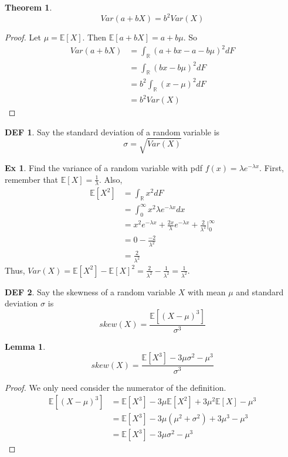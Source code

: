 \documentclass{article}
\newtheorem{theorem}{Theorem}
\theoremstyle{definition}\newtheorem{definition}{DEF}
\theoremstyle{definition}\newtheorem{example}{Ex}
\theoremstyle{lemma}\newtheorem{lemma}{Lemma}
\theoremstyle{corrolary}\newtheorem{corrolary}{Cor}
\begin{document}
\begin{theorem}
\begin{equation}
Var(a + bX) = b^2 Var(X)
\end{equation}
\end{theorem}
\begin{proof}
Let $\mu=\mathbb{E}[X]$. Then $\mathbb{E}[a + bX] = a + b\mu$.
So
\begin{align*}
Var(a+bX) &= \int_\mathbb{R} (a + bx - a - b\mu )^2 dF\\
&= \int_\mathbb{R} (bx - b\mu )^2 dF \\
&= b^2 \int_\mathbb{R} (x-\mu )^2 dF\\
&= b^2 Var(X)
\end{align*}
\end{proof}

\begin{definition}
Say the standard deviation of a random variable is
\begin{equation}
\sigma = \sqrt{Var(X)}
\end{equation}
\end{definition}

\begin{example}
Find the variance of a random variable with pdf $f(x)=\lambda e^{-\lambda x}$.
First, remember that $\mathbb{E}[X] = \frac{1}{\lambda}$.
Also,
\begin{align*}
\mathbb{E}[X^2] &= \int_\mathbb{R} x^2 dF\\
&= \int_0^\infty x^2 \lambda e^{-\lambda x}dx\\
&= x^2 e^{-\lambda x} + \frac{2x}{\lambda} e^{-\lambda x} + \frac{2}{\lambda^2} |_0^\infty \\
&= 0 - \frac{-2}{\lambda^2}\\
&= \frac{2}{\lambda^2}
\end{align*}
Thus, $Var(X) = \mathbb{E}[X^2] - \mathbb{E}[X]^2 = \frac{2}{\lambda^2} - \frac{1}{\lambda^2} = \frac{1}{\lambda^2}$.
\end{example}

\begin{definition}
Say the skewness of a random variable $X$ with mean $\mu$ and standard deviation $\sigma$ is
\begin{equation}
skew(X)=\frac{\mathbb{E}[(X-\mu)^3]}{\sigma^3}
\end{equation}
\end{definition}

\begin{lemma}
\begin{equation}
skew(X)=\frac{\mathbb{E}[X^3]-3\mu \sigma^2 -\mu^3}{\sigma^3}
\end{equation}
\end{lemma}
\begin{proof}
We only need consider the numerator of the definition.
\begin{align*}
\mathbb{E}[(X-\mu)^3] &= \mathbb{E}[X^3] -3\mu \mathbb{E}[X^2] + 3\mu^2 \mathbb{E}[X] -\mu^3 \\
&= \mathbb{E}[X^3] -3\mu (\mu^2 + \sigma^2) + 3\mu^3 -\mu^3\\
&= \mathbb{E}[X^3] -3\mu \sigma^2 -\mu^3
\end{align*}
\end{proof}
\end{document}
